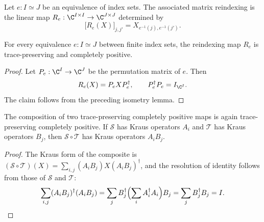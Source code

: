 \begin{definition}
    \label{def:mpdo_equiv_reindex_map}
    \leanok
    Let $e:I\simeq J$ be an equivalence of index sets. The associated
    matrix reindexing is the linear map
    $R_e:\C^{I\times I}\to\C^{J\times J}$ determined by
    \[
        \bigl[R_e(X)\bigr]_{j,j'}=X_{e^{-1}(j),e^{-1}(j')}.
    \]
\end{definition}

\begin{theorem}
    \label{thm:mpdo_equiv_reindex_cptp}
    \leanok
    For every equivalence $e:I\simeq J$ between finite index sets, the
    reindexing map $R_e$ is trace-preserving and completely positive.
\end{theorem}
\begin{proof}
    \leanok
    Let $P_e:\C^I\to\C^J$ be the permutation matrix of $e$. Then
    \[
        R_e(X)=P_eXP_e^\dagger,
        \qquad P_e^\dagger P_e=I_{\C^I}.
    \]
    The claim follows from the preceding isometry lemma.
\end{proof}


\begin{lemma}
    \label{lem:is_kraus_cptp_comp}
    \leanok
    The composition of two trace-preserving completely positive maps is again
    trace-preserving completely positive. If $\mathcal{S}$ has Kraus operators
    $A_i$ and $\mathcal{T}$ has Kraus operators $B_j$, then $\mathcal{S} \circ
    \mathcal{T}$ has Kraus operators $A_i B_j$.
\end{lemma}
\begin{proof}
    \leanok
    The Kraus form of the composite is
    $(\mathcal{S} \circ \mathcal{T})(X) = \sum_{i,j} (A_i B_j) X (A_i B_j)^\dagger$,
    and the resolution of identity follows from those of $\mathcal{S}$ and
    $\mathcal{T}$:
    \[
        \sum_{i,j} (A_i B_j)^\dagger (A_i B_j)
        = \sum_{j} B_j^\dagger \Bigl( \sum_{i} A_i^\dagger A_i \Bigr) B_j
        = \sum_{j} B_j^\dagger B_j = I.
    \]
\end{proof}

